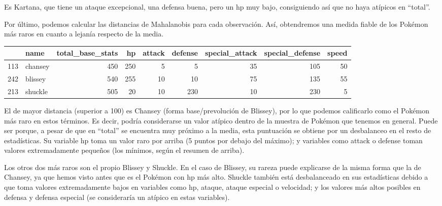 \documentclass[
  11.8pt,
]{extreport}
\begin{document}
Es Kartana, que tiene un ataque excepcional, una defensa buena, pero un
hp muy bajo, consiguiendo así que no haya atípicos en ``total''.

Por último, podemos calcular las distancias de Mahalanobis para cada
observación. Así, obtendremos una medida fiable de los Pokémon más raros
en cuanto a lejanía respecto de la media.

\begin{table}[H]
\centering\begingroup\fontsize{9.5}{11.5}\selectfont

\begin{tabular}{llrrrrrrr}
\toprule
  & name & total\_base\_stats & hp & attack & defense & special\_attack & special\_defense & speed\\
\midrule
113 & chansey & 450 & 250 & 5 & 5 & 35 & 105 & 50\\
242 & blissey & 540 & 255 & 10 & 10 & 75 & 135 & 55\\
213 & shuckle & 505 & 20 & 10 & 230 & 10 & 230 & 5\\
\bottomrule
\end{tabular}
\endgroup{}
\end{table}

El de mayor distancia (superior a 100) es Chansey (forma
base/prevolución de Blissey), por lo que podemos calificarlo como el
Pokémon más raro en estos términos. Es decir, podría considerarse un
valor atípico dentro de la muestra de Pokémon que tenemos en general.
Puede ser porque, a pesar de que en ``total'' se encuentra muy próximo a
la media, esta puntuación se obtiene por un desbalanceo en el resto de
estadísticas. Su variable hp toma un valor raro por arriba (5 puntos por
debajo del máximo); y variables como attack o defense toman valores
extremadamente pequeños (los mínimos, según el resumen de arriba).

Los otros dos más raros son el propio Blissey y Shuckle. En el caso de
Blissey, su rareza puede explicarse de la misma forma que la de Chansey,
ya que hemos visto antes que es el Pokémon con hp más alto. Shuckle
también está desbalanceado en sus estadísticas debido a que toma valores
extremadamente bajos en variables como hp, ataque, ataque especial o
velocidad; y los valores más altos posibles en defensa y defensa
especial (se consideraría un atípico en estas variables).
\end{document}
